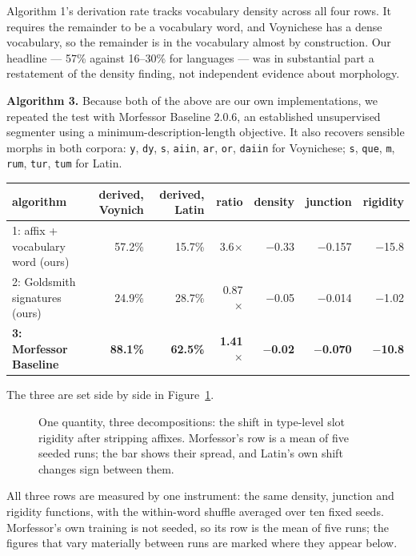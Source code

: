 \documentclass[11pt,a4paper]{article}
\begin{document}
Algorithm 1's derivation rate tracks vocabulary density across all four rows. It requires the remainder to be a vocabulary word, and Voynichese has a dense vocabulary, so the remainder is in the vocabulary almost by construction. Our headline --- 57\% against 16--30\% for languages --- was in substantial part a restatement of the density finding, not independent evidence about morphology.


\textbf{Algorithm 3.} Because both of the above are our own implementations, we repeated the test with Morfessor Baseline 2.0.6, an established unsupervised segmenter using a minimum-description-length objective. It also recovers sensible morphs in both corpora: \texttt{y}, \texttt{dy}, \texttt{s}, \texttt{aiin}, \texttt{ar}, \texttt{or}, \texttt{daiin} for Voynichese; \texttt{s}, \texttt{que}, \texttt{m}, \texttt{rum}, \texttt{tur}, \texttt{tum} for Latin.


\begin{table}[htbp]\centering\small
\begin{tabular}{@{}lrrrrrr@{}}
\toprule
algorithm & derived, Voynich & derived, Latin & ratio & density & junction & rigidity \\
\midrule
1: affix + vocabulary word (ours) & 57.2\% & 15.7\% & 3.6$\times$ & $-$0.33 & $-$0.157 & $-$15.8 \\
2: Goldsmith signatures (ours) & 24.9\% & 28.7\% & 0.87$\times$ & $-$0.05 & $-$0.014 & $-$1.02 \\
\textbf{3: Morfessor Baseline} & \textbf{88.1\%} & \textbf{62.5\%} & \textbf{1.41$\times$} & \textbf{$-$0.02} & \textbf{$-$0.070} & \textbf{$-$10.8} \\
\bottomrule
\end{tabular}
\end{table}


The three are set side by side in Figure~\ref{fig:3}.


\begin{figure}[htbp]\centering

\caption{One quantity, three decompositions: the shift in type-level slot rigidity after stripping affixes. Morfessor's row is a mean of five seeded runs; the bar shows their spread, and Latin's own shift changes sign between them.}
\label{fig:3}
\end{figure}

All three rows are measured by one instrument: the same density, junction and rigidity functions, with the within-word shuffle averaged over ten fixed seeds. Morfessor's own training is not seeded, so its row is the mean of five runs; the figures that vary materially between runs are marked where they appear below.
\end{document}
